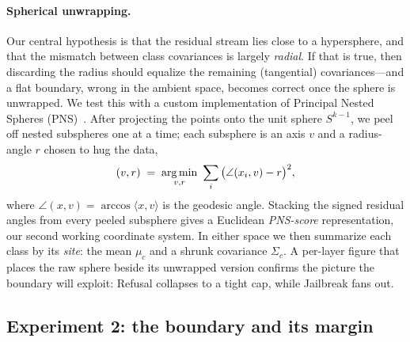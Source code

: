 \paragraph{Spherical unwrapping.}
Our central hypothesis is that the residual stream lies close to a hypersphere, and that the
mismatch between class covariances is largely \emph{radial}. If that is true, then discarding
the radius should equalize the remaining (tangential) covariances---and a flat boundary, wrong
in the ambient space, becomes correct once the sphere is unwrapped. We test this with a custom
implementation of Principal Nested Spheres (PNS)~\citep{jung2012pns}. After projecting the
points onto the unit sphere $S^{k-1}$, we peel off nested subspheres one at a time; each
subsphere is an axis $v$ and a radius-angle $r$ chosen to hug the data,
\begin{equation}
  (v, r) \;=\; \operatorname*{arg\,min}_{v, r}\ \sum_i \big(\angle(x_i, v) - r\big)^2 ,
  \label{eq:pns}
\end{equation}
where $\angle(x, v) = \arccos\langle x, v\rangle$ is the geodesic angle. Stacking the signed
residual angles from every peeled subsphere gives a Euclidean \emph{PNS-score} representation,
our second working coordinate system. In either space we then summarize each class by its
\emph{site}: the mean $\mu_c$ and a shrunk covariance $\Sigma_c$. A per-layer figure that places
the raw sphere beside its unwrapped version confirms the picture the boundary will exploit:
Refusal collapses to a tight cap, while Jailbreak fans out.

\subsection{Experiment 2: the boundary and its margin}
\label{sec:e2}

